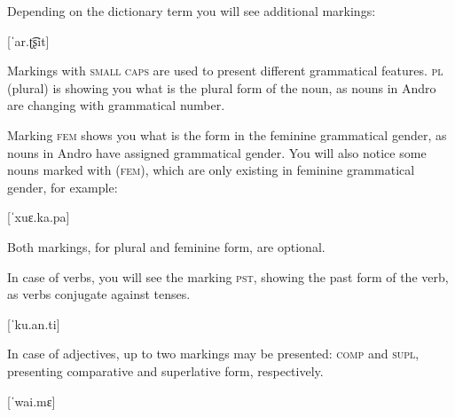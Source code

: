 \begin{spacing}{1.1}
Depending on the dictionary term you will see additional markings:

[ˈar.ʈ͡ʂit]
\skipline

Markings with \textsc{small caps} are used to present different grammatical
features. \textsc{pl} (plural) is showing you what is the plural form of the
noun, as nouns in Andro are changing with grammatical number.

Marking \textsc{fem} shows you what is the form in the feminine grammatical
gender, as nouns in Andro have assigned grammatical gender. You will also notice
some nouns marked with (\textsc{fem}), which are only existing in feminine
grammatical gender, for example:

[ˈxuɛ.ka.pa]
\skipline

Both markings, for plural and feminine form, are optional.

In case of verbs, you will see the marking \textsc{pst}, showing the past form
of the verb, as verbs conjugate against tenses.

[ˈku.an.ti]
\skipline

In case of adjectives, up to two markings may be presented: \textsc{comp} and
\textsc{supl}, presenting comparative and superlative form, respectively.

[ˈwai.mɛ]
\skipline

\skipline

\end{spacing}
